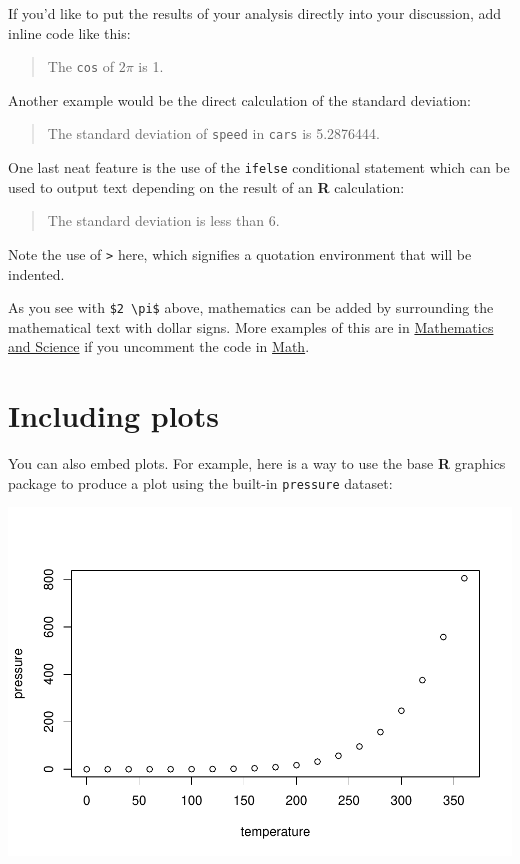 \documentclass[12pt,twoside]{deuthesis}
\begin{document}
If you'd like to put the results of your analysis directly into your discussion, add inline code like this:
\begin{quote}
The \texttt{cos} of \(2 \pi\) is 1.
\end{quote}
Another example would be the direct calculation of the standard deviation:
\begin{quote}
The standard deviation of \texttt{speed} in \texttt{cars} is 5.2876444.
\end{quote}
One last neat feature is the use of the \texttt{ifelse} conditional statement which can be used to output text depending on the result of an \textbf{R} calculation:
\begin{quote}
The standard deviation is less than 6.
\end{quote}
Note the use of \texttt{\textgreater{}} here, which signifies a quotation environment that will be indented.

As you see with \texttt{\$2\ \textbackslash{}pi\$} above, mathematics can be added by surrounding the mathematical text with dollar signs. More examples of this are in \protect\hyperlink{math-sci}{Mathematics and Science} if you uncomment the code in \protect\hyperlink{math}{Math}.

\hypertarget{including-plots}{%
\section{Including plots}\label{including-plots}}

You can also embed plots. For example, here is a way to use the base \textbf{R} graphics package to produce a plot using the built-in \texttt{pressure} dataset:

\includegraphics{BP_Rapor_files/figure-latex/pressure-1.pdf}
\end{document}
